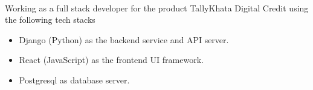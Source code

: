  \\

\vspace{\topsep} %
\begin{tightitemize} 
\item Working as a full stack developer for the product TallyKhata Digital Credit using the following tech stacks
	\begin{itemize}
	\item Django (Python) as the backend service and API server.
	\item React (JavaScript) as the frontend UI framework.
	\item Postgresql as database server.
    \end{itemize}
\end{tightitemize}

\sectionspace %
